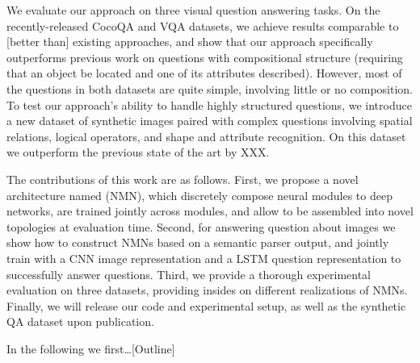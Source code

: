 




We evaluate our approach on three visual question answering tasks. On the
recently-released CocoQA \cite{yu15arxiv} and  VQA \cite{antol15iccv} datasets,
we achieve results comparable to [better than] existing approaches, and show
that our approach specifically outperforms previous work on questions with
compositional structure (\eg requiring that an object be located and one of its
attributes described). However, most of the questions in both datasets are quite
simple, involving little or no composition.  To test our approach's ability to
handle highly structured questions, we introduce a new dataset of synthetic
images paired with complex questions involving spatial relations, logical
operators, and shape and attribute recognition. On this dataset we outperform
the previous state of the art by XXX.


The contributions of this work are as follows. First, we propose a novel
architecture named \nmn (NMN), which discretely compose neural modules to deep
networks, are trained jointly across modules, and allow to be assembled into
novel topologies at evaluation time.  Second, for answering question about
images we show how to construct NMNs based on a semantic parser output, and
jointly train with a CNN image representation and a LSTM question representation
to successfully answer questions.  Third, we provide a thorough experimental
evaluation on three datasets, providing insides on different realizations of
NMNs.  Finally, we will release our code and experimental setup, as well as the
synthetic QA dataset upon publication.

In the following we first\ldots  [Outline]

